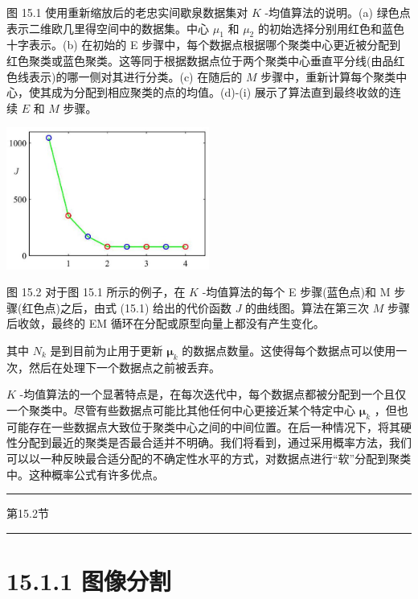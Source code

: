 \documentclass[10pt]{article}
\newcommand{\HRule}{\begin{center}\rule{0.9\linewidth}{0.2mm}\end{center}}
\begin{document}
图 15.1 使用重新缩放后的老忠实间歇泉数据集对 \(K\) -均值算法的说明。(a) 绿色点表示二维欧几里得空间中的数据集。中心 \({\mu }_{1}\) 和 \({\mu }_{2}\) 的初始选择分别用红色和蓝色十字表示。(b) 在初始的 E 步骤中，每个数据点根据哪个聚类中心更近被分配到红色聚类或蓝色聚类。这等同于根据数据点位于两个聚类中心垂直平分线(由品红色线表示)的哪一侧对其进行分类。(c) 在随后的 \(M\) 步骤中，重新计算每个聚类中心，使其成为分配到相应聚类的点的均值。(d)-(i) 展示了算法直到最终收敛的连续 \(E\) 和 \(M\) 步骤。

\begin{center}
\includegraphics[max width=0.5\textwidth]{images/0194e279-9b28-703a-88f4-c3ac21e2010d_483_916_354_629_440_0.jpg}
\end{center}
\hspace*{3em} 

图 15.2 对于图 15.1 所示的例子，在 \(K\) -均值算法的每个 E 步骤(蓝色点)和 M 步骤(红色点)之后，由式 (15.1) 给出的代价函数 \(J\) 的曲线图。算法在第三次 \(M\) 步骤后收敛，最终的 EM 循环在分配或原型向量上都没有产生变化。

其中 \({N}_{k}\) 是到目前为止用于更新 \({\mathbf{\mu }}_{k}\) 的数据点数量。这使得每个数据点可以使用一次，然后在处理下一个数据点之前被丢弃。

\(K\) -均值算法的一个显著特点是，在每次迭代中，每个数据点都被分配到一个且仅一个聚类中。尽管有些数据点可能比其他任何中心更接近某个特定中心 \({\mathbf{\mu }}_{k}\) ，但也可能存在一些数据点大致位于聚类中心之间的中间位置。在后一种情况下，将其硬性分配到最近的聚类是否最合适并不明确。我们将看到，通过采用概率方法，我们可以以一种反映最合适分配的不确定性水平的方式，对数据点进行“软”分配到聚类中。这种概率公式有许多优点。

\HRule

第15.2节

\HRule

\section*{15.1.1 图像分割}
\end{document}
